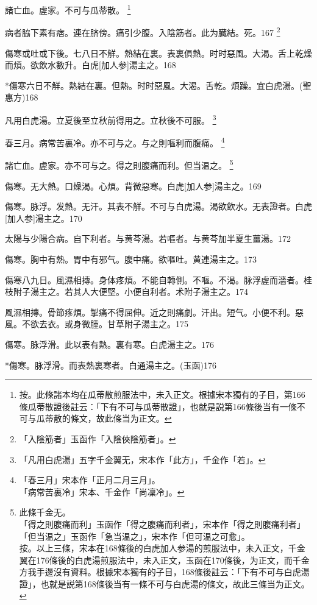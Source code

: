 \documentclass[12pt,twoside,UTF8,b5paper]{ctexbook}
\begin{document}
諸亡血。虗家。不可与瓜蒂散。
	\footnote{按。此條諸本均在瓜蒂散煎服法中，未入正文。根據宋本獨有的子目，第166條瓜蒂散證後註云：「下有不可与瓜蒂散證」，也就是説第166條後当有一條不可与瓜蒂散的條文，故此條当为正文。}

病者脇下素有痞。連在脐傍。痛引少腹。入陰筋者。此为臓結。死。167
	\footnote{「入陰筋者」玉函作「入陰俠陰筋者」。}

傷寒或吐或下後。七八日不觧。熱結在裏。表裏俱熱。时时惡風。大渴。舌上乾燥而煩。欲飲水數升。白虎[加人参]湯主之。168

*傷寒六日不觧。熱結在裏。但熱。时时惡風。大渴。舌乾。煩躁。宜白虎湯。(聖惠方)168

凡用白虎湯。立夏後至立秋前得用之。立秋後不可服。
	\footnote{「凡用白虎湯」五字千金翼无，宋本作「此方」，千金作「若」。}

春三月。病常苦裏冷。亦不可与之。与之則嘔利而腹痛。
	\footnote{「春三月」宋本作「正月二月三月」。\\「病常苦裏冷」宋本、千金作「尚凜冷」。}

諸亡血。虗家。亦不可与之。得之則腹痛而利。但当温之。
	\footnote{此條千金无。\\「得之則腹痛而利」玉函作「得之腹痛而利者」，宋本作「得之則腹痛利者」\\「但当温之」玉函作「急当温之」，宋本作「但可温之可愈」。\\按。以上三條，宋本在168條後的白虎加人参湯的煎服法中，未入正文，千金翼在176條後的白虎湯煎服法中，未入正文，玉函在170條後，为正文，而千金方我手邊沒有資料。根據宋本獨有的子目，168條後註云：「下有不可与白虎湯證」，也就是説第168條後当有一條不可与白虎湯的條文，故此三條当为正文。}

傷寒。无大熱。口燥渴。心煩。背微惡寒。白虎[加人参]湯主之。169

傷寒。脉浮。发熱。无汗。其表不觧。不可与白虎湯。渴欲飲水。无表證者。白虎[加人参]湯主之。170

太陽与少陽合病。自下利者。与黄芩湯。若嘔者。与黄芩加半夏生薑湯。172

傷寒。胸中有熱。胃中有邪气。腹中痛。欲嘔吐。黄連湯主之。173

傷寒八九日。風濕相摶。身体疼煩。不能自轉側。不嘔。不渴。脉浮虗而濇者。桂枝附子湯主之。若其人大便堅。小便自利者。术附子湯主之。174

風濕相摶。骨節疼煩。掣痛不得屈伸。近之則痛劇。汗出。短气。小便不利。惡風。不欲去衣。或身微腫。甘草附子湯主之。175

傷寒。脉浮滑。此以表有熱。裏有寒。白虎湯主之。176

*傷寒。脉浮滑。而表熱裏寒者。白通湯主之。(玉函)176
\end{document}
